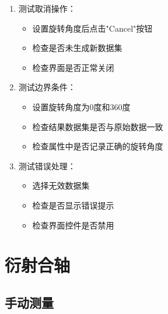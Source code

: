 \documentclass[a4paper,12pt]{report}	%
\begin{document}
\begin{enumerate}
    \item 测试取消操作：
    \begin{itemize}
        \item 设置旋转角度后点击"Cancel"按钮
        \item 检查是否未生成新数据集
        \item 检查界面是否正常关闭
    \end{itemize}

    \item 测试边界条件：
    \begin{itemize}
        \item 设置旋转角度为0度和360度
        \item 检查结果数据集是否与原始数据一致
        \item 检查属性中是否记录正确的旋转角度
    \end{itemize}

    \item 测试错误处理：
    \begin{itemize}
        \item 选择无效数据集
        \item 检查是否显示错误提示
        \item 检查界面控件是否禁用
    \end{itemize}

\end{enumerate}


\section{衍射合轴}

\subsection{手动测量}
\end{document}
